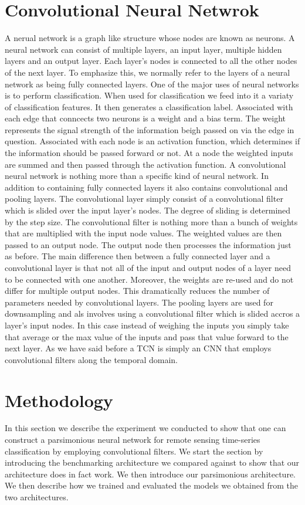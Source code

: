 \documentclass{article}
\begin{document}
 \section{Convolutional Neural Netwrok}
 A nerual network is a graph like structure whose nodes are known as neurons. A neural network can consist of multiple layers, an input layer, multiple hidden layers and an output layer. Each layer's nodes is connected to all the other nodes of the next layer. To emphasize this, we normally refer to the layers of a neural network as being fully connected layers. One of the major uses of neural networks is to perform classification. When used for classification we feed into it a variaty of classification features. It then generates a classification label. Associated with each edge that conncects two neurons is a weight and a bias term. The weight represents the signal strength of the information beigh passed on via the edge in question. Associated with each node is an activation function, which determines if the information should be passed forward or not. At a node the weighted inputs are summed and then passed through the activation function. A convolutional neural network is nothing more than a specific kind of neural network. In addition to containing fully connected layers it also contains convolutional and pooling layers. The convolutional layer simply consist of a convolutional filter which is slided over the input layer's nodes. The degree of sliding is determined by the step size. The convolutional filter is nothing more than a bunch of weights that are multiplied with the input node values. The weighted values are then passed to an output node. The output node then processes the information just as before. The main difference then between a fully connected layer and a convolutional layer is that not all of the input and output nodes of a layer need to be connected with one another. Moreover, the weights are re-used and do not differ for multiple output nodes. This dramatically reduces the number of parameters needed by convolutional layers. The pooling layers are used for downsampling and als involves using a convolutional filter which is slided accros a layer's input nodes. In this case instead of weighing the inputs you simply take that average or the max value of the inputs and pass that value forward to the next layer. As we have said before a TCN is simply an CNN that employs convolutional filters along the temporal domain.  
 
\section{Methodology}
\label{sec:exp}
In this section we describe the experiment we conducted to show that one can construct a parsimonious neural network for remote sensing time-series classification by employing convolutional filters. We start the section by introducing the benchmarking architecture we compared against to show that our architecture does in fact work. We then introduce our parsimonious architecture. We then describe how we trained and evaluated the models we obtained from the two architectures. 
\end{document}
